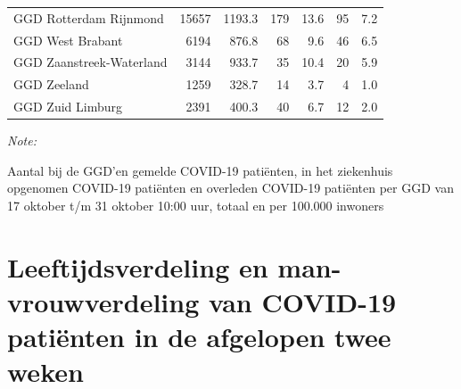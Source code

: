 \documentclass[
  english,
  man,floatsintext]{apa6}
\begin{document}
\begin{table}[H]
\begin{threeparttable}
\begin{tabular}{lrrrrrr}
GGD Rotterdam Rijnmond & 15657 & 1193.3 & 179 & 13.6 & 95 & 7.2\\
GGD West Brabant & 6194 & 876.8 & 68 & 9.6 & 46 & 6.5\\
GGD Zaanstreek-Waterland & 3144 & 933.7 & 35 & 10.4 & 20 & 5.9\\
GGD Zeeland & 1259 & 328.7 & 14 & 3.7 & 4 & 1.0\\
GGD Zuid Limburg & 2391 & 400.3 & 40 & 6.7 & 12 & 2.0\\
\bottomrule
\end{tabular}
\begin{tablenotes}
\item \textit{Note: } 
\item Aantal bij de GGD’en gemelde COVID-19 patiënten, in het ziekenhuis opgenomen COVID-19 patiënten en overleden COVID-19 patiënten per GGD van 17 oktober t/m 31 oktober 10:00 uur, totaal en per 100.000 inwoners
\end{tablenotes}
\end{threeparttable}
\endgroup{}
\end{table}

\newpage

\hypertarget{leeftijdsverdeling-en-man-vrouwverdeling-van-covid-19-patiuxebnten-in-de-afgelopen-twee-weken}{%
\section{Leeftijdsverdeling en man-vrouwverdeling van COVID-19 patiënten in de afgelopen twee weken}\label{leeftijdsverdeling-en-man-vrouwverdeling-van-covid-19-patiuxebnten-in-de-afgelopen-twee-weken}}
\end{document}
